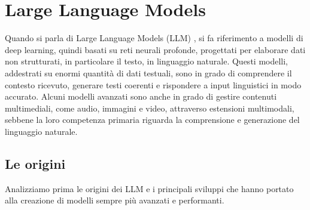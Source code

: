 \chapter{Large Language Models}
Quando si parla di Large Language Models (LLM) \cite{minaee2024largelanguagemodelssurvey}, si fa riferimento a modelli di deep learning, quindi basati su reti neurali profonde, progettati per elaborare dati non strutturati, in particolare il testo, in linguaggio naturale. Questi modelli, addestrati su enormi quantità di dati testuali, sono in grado di comprendere il contesto ricevuto, generare testi coerenti e rispondere a input linguistici in modo accurato. Alcuni modelli avanzati sono anche in grado di gestire contenuti multimediali, come audio, immagini e video, attraverso estensioni multimodali, sebbene la loro competenza primaria riguarda la comprensione e generazione del linguaggio naturale.

\section{Le origini}
Analizziamo prima le origini dei LLM e i principali sviluppi che hanno portato alla creazione di modelli sempre più avanzati e performanti.

